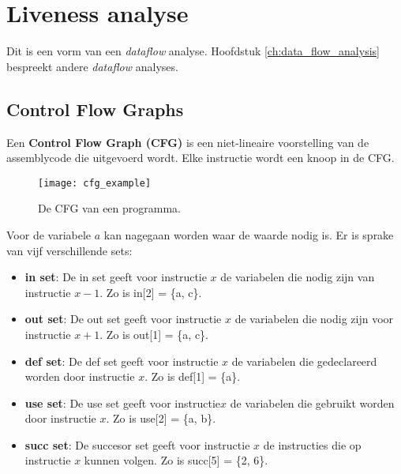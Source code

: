 \chapter{Liveness analyse}
\label{ch:liveness_analyse}

Dit is een vorm van een \textit{dataflow} analyse. Hoofdstuk \ref{ch:data_flow_analysis} bespreekt andere \textit{dataflow} analyses.

\section{Control Flow Graphs}
Een \textbf{Control Flow Graph (CFG)} is een niet-lineaire voorstelling van de assemblycode die uitgevoerd wordt. Elke instructie wordt een knoop in de CFG.

\begin{figure}[ht]
	
	\texttt{[image: cfg\_example]}
	\caption{De CFG van een programma.}
	\label{fig:cfg_example}
\end{figure}



Voor de variabele $a$ kan nagegaan worden waar de waarde nodig is. Er is sprake van vijf verschillende sets:
\begin{itemize}
	\item \textbf{in set}:  De in set geeft voor instructie $x$ de variabelen die nodig zijn van instructie $x - 1$. Zo is in[2] = \{a, c\}.
	\item \textbf{out set}: De out set geeft voor instructie $x$ de variabelen die nodig zijn voor instructie $x + 1$. Zo is out[1] = \{a, c\}.
	\item \textbf{def set}: De def set geeft voor instructie $x$ de variabelen die gedeclareerd worden door instructie $x$. Zo is def[1] = \{a\}.
	\item \textbf{use set}: De use set geeft voor instructie$x$ de variabelen die gebruikt worden door instructie $x$. Zo is use[2] = \{a, b\}.
	\item \textbf{succ set}: De succesor set geeft voor instructie $x$ de instructies die op instructie $x$ kunnen volgen. Zo is succ[5] = \{2, 6\}.
\end{itemize}

